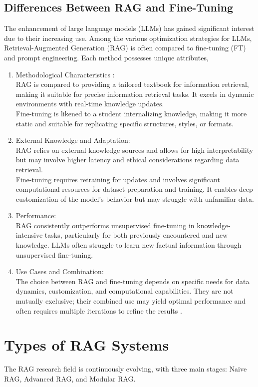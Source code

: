 \subsection{ Differences Between RAG and Fine-Tuning}
The enhancement of large language models (LLMs) has gained significant interest due to their increasing use. Among the various optimization strategies for LLMs, Retrieval-Augmented Generation (RAG) is often compared to fine-tuning (FT) and prompt engineering. Each method possesses unique attributes,
\begin{enumerate}
	\item Methodological Characteristics :\\
	RAG is compared to providing a tailored textbook for information retrieval, making it suitable for precise information retrieval tasks. It excels in dynamic environments with real-time knowledge updates. \\
	Fine-tuning is likened to a student internalizing knowledge, making it more static and suitable for replicating specific structures, styles, or formats.
	\item External Knowledge and Adaptation: \\
	RAG relies on external knowledge sources and allows for high interpretability but may involve higher latency and ethical considerations regarding data retrieval. \\
	Fine-tuning requires retraining for updates and involves significant computational resources for dataset preparation and training. It enables deep customization of the model’s behavior but may struggle with unfamiliar data.
	\item Performance: \\ RAG consistently outperforms unsupervised fine-tuning in knowledge-intensive tasks, particularly for both previously encountered and new knowledge.
	LLMs often struggle to learn new factual information through unsupervised fine-tuning.
	\item Use Cases and Combination: \\
	The choice between RAG and fine-tuning depends on specific needs for data dynamics, customization, and computational capabilities. They are not mutually exclusive; their combined use may yield optimal performance and often requires multiple iterations to refine the results \cite{gao2024retrieval}.
	
\end{enumerate}
\section{Types of RAG Systems}
The RAG research field is continuously evolving, with three main stages: Naive RAG, Advanced RAG, and Modular RAG.

